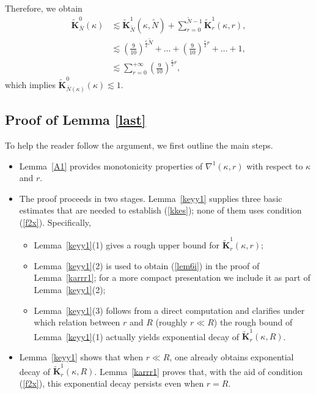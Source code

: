 \documentclass{amsart}
\newcounter{item}[section]
\theoremstyle{definition}
\begin{document}
\noindent Therefore, we obtain
\begin{equation}\label{nrevxx}
	\begin{split}
		\widetilde{\mathbf{K}}^0_{\bar{N}}(\kappa)&\lesssim \widetilde{\mathbf{K}}^1_{\tilde{N}}(\kappa,\tilde{N})+\sum_{r=0}^{\tilde{N}-1}\widetilde{\mathbf{K}}^1_{r}(\kappa,r),\\
		&\lesssim  (\frac{9}{10})^{\frac{\varepsilon}{2} \tilde{N}}+\ldots+(\frac{9}{10})^{\frac{\varepsilon}{2} r}+\ldots+1 ,\\
		&\lesssim \sum_{r=0}^{+\infty}(\frac{9}{10})^{\frac{\varepsilon}{2} r},
	\end{split}
\end{equation}
which implies {$\widetilde{\mathbf{K}}_{\bar{N}(\kappa)}^0(\kappa)\lesssim 1$.}



\subsection{Proof of Lemma \ref{last}}




To help the reader follow the argument, we first outline the main steps.

\begin{itemize}
	\item[(1)] Lemma~\ref{A1} provides monotonicity properties of \(\nabla^1(\kappa,r)\) with respect to \(\kappa\) and \(r\).
	
	\item[(2)] The proof proceeds in two stages. Lemma~\ref{keyy1} supplies three basic estimates that are needed to establish (\ref{kkes}); none of them uses condition (\ref{f2x}). Specifically,
	\begin{itemize}
		\item Lemma~\ref{keyy1}(1) gives a rough upper bound for \(\widetilde{\mathbf{K}}_{r}^1(\kappa,r)\);
		\item Lemma~\ref{keyy1}(2) is used to obtain (\ref{lem6i}) in the proof of Lemma~\ref{karrr1}; for a more compact presentation we include it as part of Lemma~\ref{keyy1}(2);
		\item Lemma~\ref{keyy1}(3) follows from a direct computation and clarifies under which relation between \(r\) and \(R\) (roughly \(r\ll R\)) the rough bound of Lemma~\ref{keyy1}(1) actually yields exponential decay of \(\widetilde{\mathbf{K}}_{r}^1(\kappa,R)\).
	\end{itemize}
	
	\item[(3)] Lemma~\ref{keyy1} shows that when \(r\ll R\), one already obtains exponential decay of \(\widetilde{\mathbf{K}}_{r}^1(\kappa,R)\). Lemma~\ref{karrr1} proves that, with the aid of condition (\ref{f2x}), this exponential decay persists even when \(r=R\).
\end{itemize}
\end{document}

